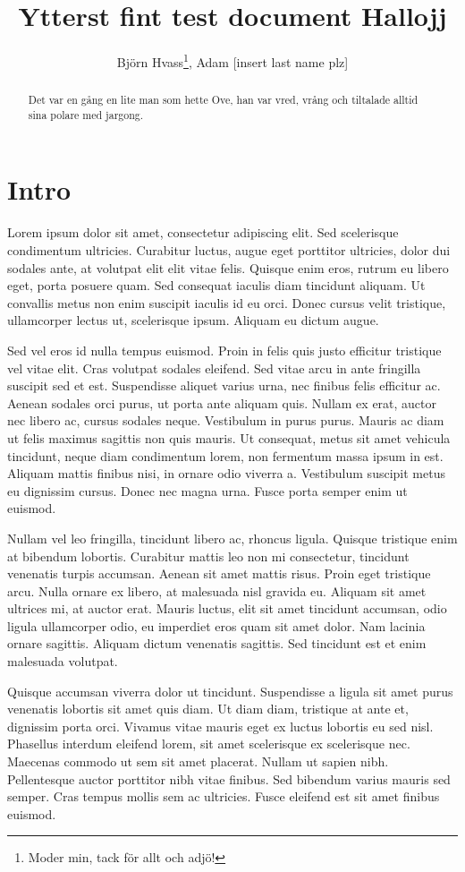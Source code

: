 \documentclass[a4paper,10pt]{article}
\title{Ytterst fint test document Hallojj}
\author{Björn Hvass\thanks{Moder min, tack för allt och adjö!}, Adam [insert last name plz]}
\begin{document}
\maketitle

\begin{abstract}
Det var en gång en lite man som hette Ove, han var vred, vrång och tiltalade alltid sina polare med jargong.\end{abstract}

\section{Intro}\label{sec:Intro}
Lorem ipsum dolor sit amet, consectetur adipiscing elit. Sed scelerisque condimentum ultricies. Curabitur luctus, augue eget porttitor ultricies, dolor dui sodales ante, at volutpat elit elit vitae felis. Quisque enim eros, rutrum eu libero eget, porta posuere quam. Sed consequat iaculis diam tincidunt aliquam. Ut convallis metus non enim suscipit iaculis id eu orci. Donec cursus velit tristique, ullamcorper lectus ut, scelerisque ipsum. Aliquam eu dictum augue.

Sed vel eros id nulla tempus euismod. Proin in felis quis justo efficitur tristique vel vitae elit. Cras volutpat sodales eleifend. Sed vitae arcu in ante fringilla suscipit sed et est. Suspendisse aliquet varius urna, nec finibus felis efficitur ac. Aenean sodales orci purus, ut porta ante aliquam quis. Nullam ex erat, auctor nec libero ac, cursus sodales neque. Vestibulum in purus purus. Mauris ac diam ut felis maximus sagittis non quis mauris. Ut consequat, metus sit amet vehicula tincidunt, neque diam condimentum lorem, non fermentum massa ipsum in est. Aliquam mattis finibus nisi, in ornare odio viverra a. Vestibulum suscipit metus eu dignissim cursus. Donec nec magna urna. Fusce porta semper enim ut euismod.

Nullam vel leo fringilla, tincidunt libero ac, rhoncus ligula. Quisque tristique enim at bibendum lobortis. Curabitur mattis leo non mi consectetur, tincidunt venenatis turpis accumsan. Aenean sit amet mattis risus. Proin eget tristique arcu. Nulla ornare ex libero, at malesuada nisl gravida eu. Aliquam sit amet ultrices mi, at auctor erat. Mauris luctus, elit sit amet tincidunt accumsan, odio ligula ullamcorper odio, eu imperdiet eros quam sit amet dolor. Nam lacinia ornare sagittis. Aliquam dictum venenatis sagittis. Sed tincidunt est et enim malesuada volutpat.

Quisque accumsan viverra dolor ut tincidunt. Suspendisse a ligula sit amet purus venenatis lobortis sit amet quis diam. Ut diam diam, tristique at ante et, dignissim porta orci. Vivamus vitae mauris eget ex luctus lobortis eu sed nisl. Phasellus interdum eleifend lorem, sit amet scelerisque ex scelerisque nec. Maecenas commodo ut sem sit amet placerat. Nullam ut sapien nibh. Pellentesque auctor porttitor nibh vitae finibus. Sed bibendum varius mauris sed semper. Cras tempus mollis sem ac ultricies. Fusce eleifend est sit amet finibus euismod.
\end{document}
